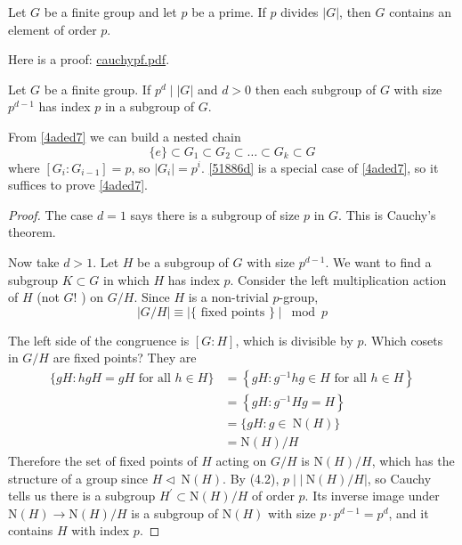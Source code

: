 \begin{theorem}
Let $G$ be a finite group and let $p$ be a prime. If $p$ divides $|G|$, then $G$ contains an element of order $p$.
\end{theorem}
\begin{note}
Here is a proof: \href{https://kconrad.math.uconn.edu/blurbs/grouptheory/cauchypf.pdf}{cauchypf.pdf}.
\end{note}
\begin{theorem}
Let $G$ be a finite group. If $p^d \mid |G|$ and $d>0$ then each subgroup of $G$ with size $p^{d-1}$ has index $p$ in a subgroup of $G$.\label{4aded7}
\end{theorem}

From \cref{4aded7} we can build a nested chain
\[
\{ e \}\subset G_1\subset G_2\subset\dots \subset G_k\subset G
\]
where $[G_i:G_{i-1}]=p$, so $\lvert G_i \rvert=p^{i}$. \cref{51886d} is a special case of \cref{4aded7}, so it suffices to prove \cref{4aded7}.

\begin{proof}
The case $d=1$ says there is a subgroup of size $p$ in $G$. This is Cauchy's theorem.

Now take $d>1$. Let $H$ be a subgroup of $G$ with size $p^{d-1}$. We want to find a subgroup $K \subset G$ in which $H$ has index $p$. Consider the left multiplication action of $H$ (not $G!$ ) on $G / H$. Since $H$ is a non-trivial $p$-group,
\begin{equation}
|G / H| \equiv \mid\{\text { fixed points }\} \mid \bmod p
\label{9fda5b}
\end{equation}

The left side of the congruence is $[G: H]$, which is divisible by $p$. Which cosets in $G / H$ are fixed points? They are
\[
\begin{aligned}
\{g H: h g H=g H \text { for all } h \in H\} & =\left\{g H: g^{-1} h g \in H \text { for all } h \in H\right\} \\
& =\left\{g H: g^{-1} H g=H\right\} \\
& =\{g H: g \in \mathrm{~N}(H)\} \\
& =\mathrm{N}(H) / H
\end{aligned}
\]
Therefore the set of fixed points of $H$ acting on $G / H$ is $\mathrm{N}(H) / H$, which has the structure of a group since $H \lhd \mathrm{~N}(H)$. By (4.2), $p\mid|\mathrm{~N}(H) / H|$, so Cauchy tells us there is a subgroup $H^{\prime} \subset \mathrm{N}(H) / H$ of order $p$. Its inverse image under $\mathrm{N}(H) \rightarrow \mathrm{N}(H) / H$ is a subgroup of $\mathrm{N}(H)$ with size $p \cdot p^{d-1}=p^d$, and it contains $H$ with index $p$.
\end{proof}

